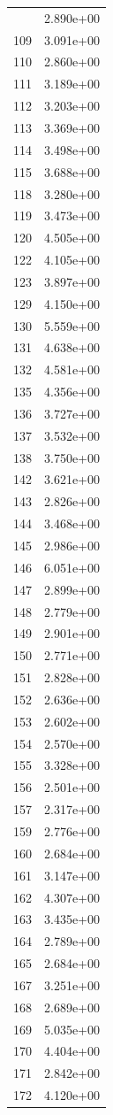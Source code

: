 \documentclass[12pt]{article}
\begin{document}
\begin{longtable}{@{}cc@{}}
\bottomrule
\endlastfoot
105 & 2.890e+00 \\
109 & 3.091e+00 \\
110 & 2.860e+00 \\
111 & 3.189e+00 \\
112 & 3.203e+00 \\
113 & 3.369e+00 \\
114 & 3.498e+00 \\
115 & 3.688e+00 \\
118 & 3.280e+00 \\
119 & 3.473e+00 \\
120 & 4.505e+00 \\
122 & 4.105e+00 \\
123 & 3.897e+00 \\
129 & 4.150e+00 \\
130 & 5.559e+00 \\
131 & 4.638e+00 \\
132 & 4.581e+00 \\
135 & 4.356e+00 \\
136 & 3.727e+00 \\
137 & 3.532e+00 \\
138 & 3.750e+00 \\
142 & 3.621e+00 \\
143 & 2.826e+00 \\
144 & 3.468e+00 \\
145 & 2.986e+00 \\
146 & 6.051e+00 \\
147 & 2.899e+00 \\
148 & 2.779e+00 \\
149 & 2.901e+00 \\
150 & 2.771e+00 \\
151 & 2.828e+00 \\
152 & 2.636e+00 \\
153 & 2.602e+00 \\
154 & 2.570e+00 \\
155 & 3.328e+00 \\
156 & 2.501e+00 \\
157 & 2.317e+00 \\
159 & 2.776e+00 \\
160 & 2.684e+00 \\
161 & 3.147e+00 \\
162 & 4.307e+00 \\
163 & 3.435e+00 \\
164 & 2.789e+00 \\
165 & 2.684e+00 \\
167 & 3.251e+00 \\
168 & 2.689e+00 \\
169 & 5.035e+00 \\
170 & 4.404e+00 \\
171 & 2.842e+00 \\
172 & 4.120e+00 \\

\bottomrule
\end{longtable}
\end{document}
